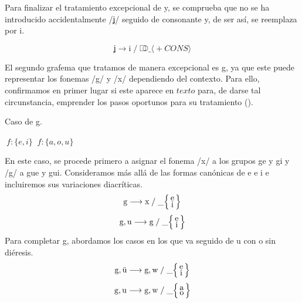 Para finalizar el tratamiento excepcional de \textlangle{}y\textrangle{}, se comprueba que no se ha introducido accidentalmente /ʝ/ seguido de consonante y, de ser así, se reemplaza por \textlangle{}i\textrangle{}.

\[\text{ʝ} \longrightarrow \text{i} \;/\; ⎄\_ {\scriptstyle\langle{}+CONS\rangle{}}\]

El segundo grafema que tratamos de manera excepcional es \textlangle{}g\textrangle{}, ya que este puede representar los fonemas /g/ y /x/ dependiendo del contexto. Para ello, confirmamos en primer lugar si este aparece en $texto$ para, de darse tal circunstancia, emprender los pasos oportunos para su tratamiento ().

\begin{algorithm}[!ht] %
	\caption{Caso de \textlangle{}g\textrangle{}.}\label{list:fonemag}
	\debiles \gets $\:f: \{e, i\}$ \;
	\fuertes \gets $\:f: \{a, o, u\}$ \;
\end{algorithm}

En este caso, se procede primero a asignar el fonema /x/ a los grupos \textlangle{}ge\textrangle{} y \textlangle{}gi\textrangle{} y /g/ a \textlangle{}gue\textrangle{} y \textlangle{}gui\textrangle{}. Consideramos más allá de las formas canónicas de \textlangle{}e\textrangle{} e \textlangle{}i\textrangle{} e incluiremos sus variaciones diacríticas.
\[
\text{g} \longrightarrow \text{x} \;/\; \_
\Big\{
\begin{smallmatrix}\text{\normalsize{e}}\\\text{\normalsize{i}}\end{smallmatrix}\Big\}\]
\[
\text{g},\text{u} \longrightarrow \text{g} \;/\; \_ 
\Big\{
\begin{smallmatrix}\text{\normalsize{e}}\\\text{\normalsize{i}}\end{smallmatrix}\Big\}
\]
Para completar \textlangle{}g\textrangle{}, abordamos los casos en los que va seguido de  \textlangle{}u\textrangle{} con o sin diéresis. 
\[
\text{g}, \text{ü}\longrightarrow \text{g}, \text{w} \;/\; \_
\Big\{
\begin{smallmatrix}\text{\normalsize{e}}\\\text{\normalsize{i}}\end{smallmatrix}\Big\}\]
\[
\text{g},\text{u} \longrightarrow \text{g}, \text{w} \;/\; \_ 
\Big\{
\begin{smallmatrix}\text{\normalsize{a}}\\\text{\normalsize{o}}\end{smallmatrix}\Big\}
\]

